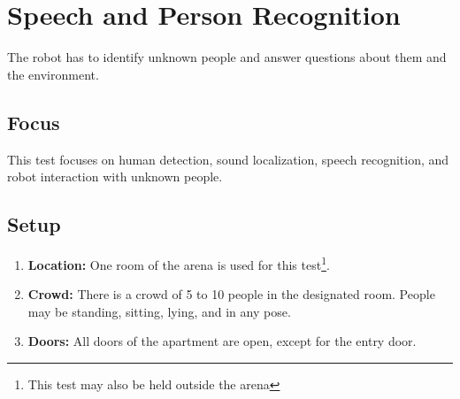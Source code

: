 \section{Speech and Person Recognition}
The robot has to identify unknown people and answer questions about them and the environment.

\subsection{Focus}
This test focuses on human detection, sound localization, speech recognition, and robot interaction with unknown people.

\subsection{Setup}
\begin{enumerate}
    \item \textbf{Location:} One room of the arena is used for this test\footnote{This test may also be held outside the arena}.
    \item \textbf{Crowd:} There is a crowd of 5 to 10 people in the designated room. People may be standing, sitting, lying, and in any pose.
    \item \textbf{Doors:} All doors of the apartment are open, except for the entry door.
\end{enumerate}

